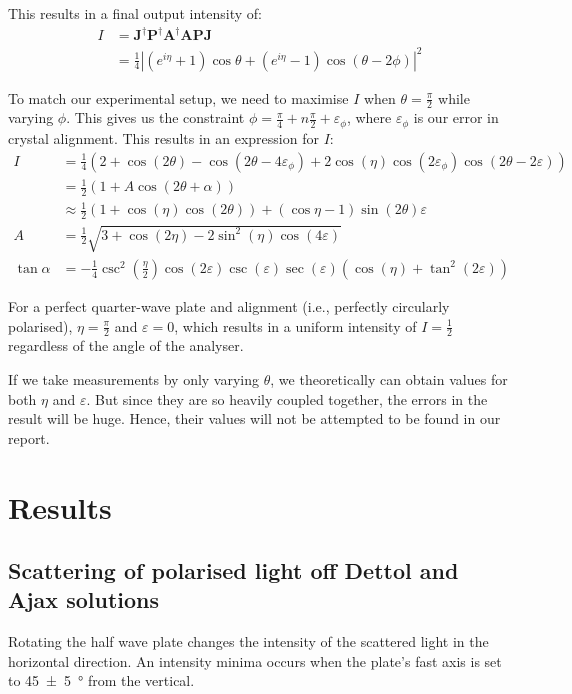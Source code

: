\documentclass[a4paper]{scrartcl}
\begin{document}
This results in a final output intensity of:
\begin{align*}
    I &= \mathbf{J}^\dagger \mathbf{P}^\dagger \mathbf{A}^\dagger \mathbf{A P J} \\
    &= \frac{1}{4} \left|\left(e^{i \eta} + 1\right) \cos \theta + \left(e^{i \eta} - 1\right) \cos(\theta - 2 \phi)\right|^2
\end{align*}

To match our experimental setup, we need to maximise \(I\) when \(\theta = \frac{\pi}{2}\) while varying \(\phi\). This gives us the constraint \(\phi = \frac{\pi}{4} + n \frac{\pi}{2} + \varepsilon_{\phi}\), where \(\varepsilon_{\phi}\) is our error in crystal alignment. This results in an expression for \(I\):
\begin{align*}
    I &= \frac{1}{4} (2 + \cos(2 \theta) - \cos(2 \theta - 4 \varepsilon_{\phi}) + 2 \cos(\eta) \cos(2 \varepsilon_{\phi}) \cos(2 \theta - 2 \varepsilon)) \\
    &= \frac{1}{2}(1 + A \cos(2 \theta + \alpha)) \\
    &\approx \frac{1}{2} (1 + \cos(\eta) \cos(2 \theta)) + (\cos \eta - 1) \sin(2 \theta) \varepsilon \\
    A &= \frac{1}{2} \sqrt{3 + \cos(2 \eta) - 2 \sin^2(\eta) \cos(4 \varepsilon)} \\
    \tan \alpha &= -\frac{1}{4} \csc^2\left(\frac{\eta}{2}\right) \cos(2 \varepsilon) \csc(\varepsilon) \sec(\varepsilon) \left(\cos(\eta) + \tan^2(2 \varepsilon)\right)
\end{align*}

For a perfect quarter-wave plate and alignment (i.e., perfectly circularly polarised), \(\eta = \frac{\pi}{2}\) and \(\varepsilon = 0\), which results in a uniform intensity of \(I = \frac{1}{2}\) regardless of the angle of the analyser.

If we take measurements by only varying \(\theta\), we theoretically can obtain values for both \(\eta\) and \(\varepsilon\). But since they are so heavily coupled together, the errors in the result will be huge. Hence, their values will not be attempted to be found in our report.

\section{Results}
\subsection{Scattering of polarised light off Dettol and Ajax solutions}
Rotating the half wave plate changes the intensity of the scattered light in the horizontal direction. An intensity minima occurs when the plate's fast axis is set to \SI{45 \pm 5}{\degree} from the vertical. 
\end{document}
